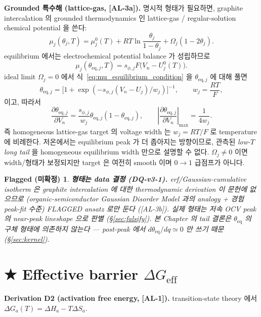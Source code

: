 \documentclass[11pt,a4paper]{article}
\newtheorem*{flagbox}{Flagged (미확정)}
\newcommand{\eff}{\mathrm{eff}}
\newcommand{\eq}{\mathrm{eq}}
\newcommand{\AL}[1]{\textsf{[AL-#1]}}
\begin{document}
\textbf{Grounded 특수해 (lattice-gas, \AL{3a}).} 명시적 형태가 필요하면, graphite
intercalation 의 grounded thermodynamics 인 lattice-gas / regular-solution chemical
potential \cite{mckinnon1983,bazant2013} 을 쓴다:
\begin{equation}
\mu_j(\theta_j,T)
=
\mu_j^0(T)
+RT\ln\frac{\theta_j}{1-\theta_j}
+\Omega_j(1-2\theta_j).
\label{eq:mu_regular_solution}
\end{equation}
equilibrium 에서는 electrochemical potential balance 가 성립하므로
\begin{equation}
\mu_j(\theta_{\eq,j},T)=s_{\phi,j}F\big(V_n-U_j^0(T)\big).
\label{eq:mu_equilibrium_condition}
\end{equation}
ideal limit $\Omega_j=0$ 에서 식~\eqref{eq:mu_equilibrium_condition} 을 $\theta_{\eq,j}$ 에 대해
풀면
\begin{equation}
\theta_{\eq,j}
=
\big[1+\exp(-s_{\phi,j}(V_n-U_j)/w_j)\big]^{-1},
\qquad
w_j=\frac{RT}{F},
\label{eq:latticegas}
\end{equation}
이고, 따라서
\begin{equation}
\frac{\partial\theta_{\eq,j}}{\partial V_n}
=
\frac{s_{\phi,j}}{w_j}\theta_{\eq,j}(1-\theta_{\eq,j}),
\qquad
\left|\frac{\partial\theta_{\eq,j}}{\partial V_n}\right|_\mathrm{max}
=
\frac{1}{4w_j}.
\label{eq:thetaeq_derivative}
\end{equation}
즉 homogeneous lattice-gas target 의 voltage width 는 $w_j=RT/F$ 로 temperature 에 비례한다.
저온에서는 equilibrium peak 가 더 좁아지는 방향이므로, 관측된 \emph{low-$T$ long tail} 을
homogeneous equilibrium width 만으로 설명할 수 없다. $\Omega_j\ne0$ 이면 width/형태가 보정되지만
target 은 여전히 smooth 이며 $0\!\to\!1$ 급점프가 아니다.
\begin{flagbox}
\textbf{형태는 data 결정 (DQ-v3-1).} erf/Gaussian-cumulative isotherm 은 graphite
intercalation 에 대한 thermodynamic derivation 이 문헌에 없으므로 (organic-semiconductor
Gaussian Disorder Model \cite{baessler1993} 과의 analogy + 경험 peak-fit 수준) FLAGGED
ansatz 로만 둔다 (\AL{3b}). 실제 형태는 저속 OCV peak 의 near-peak lineshape 으로 판별
(\S\ref{sec:falsify}). 본 Chapter 의 tail 결론은 $\theta_\eq$ 의 \emph{구체 형태에
의존하지 않는다} — post-peak 에서 $d\theta_\eq/dq\simeq0$ 만 쓰기 때문 (\S\ref{sec:kernel}).
\end{flagbox}

\section{★ Effective barrier $\Delta G_\eff$}\label{sec:barrier}
\textbf{Derivation D2 (activation free energy, \AL{1}).} transition-state theory
\cite{eyring1935,eyringchemrev1935} 에서 $\Delta G_a(T)=\Delta H_a-T\Delta S_a$.
\end{document}

